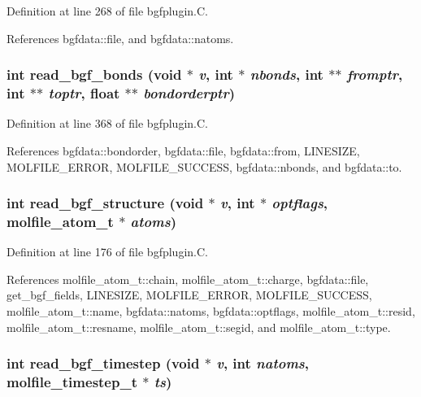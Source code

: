 Definition at line 268 of file bgfplugin.C.

References bgfdata::file, and bgfdata::natoms.
\subsubsection{\setlength{\rightskip}{0pt plus 5cm}int read\_\-bgf\_\-bonds (void $\ast$ {\em v}, int $\ast$ {\em nbonds}, int $\ast$$\ast$ {\em fromptr}, int $\ast$$\ast$ {\em toptr}, float $\ast$$\ast$ {\em bondorderptr})\hspace{0.3cm}{\tt  [static]}}\label{bgfplugin_8C_a12}




Definition at line 368 of file bgfplugin.C.

References bgfdata::bondorder, bgfdata::file, bgfdata::from, LINESIZE, MOLFILE\_\-ERROR, MOLFILE\_\-SUCCESS, bgfdata::nbonds, and bgfdata::to.
\subsubsection{\setlength{\rightskip}{0pt plus 5cm}int read\_\-bgf\_\-structure (void $\ast$ {\em v}, int $\ast$ {\em optflags}, {\bf molfile\_\-atom\_\-t} $\ast$ {\em atoms})\hspace{0.3cm}{\tt  [static]}}\label{bgfplugin_8C_a6}




Definition at line 176 of file bgfplugin.C.

References molfile\_\-atom\_\-t::chain, molfile\_\-atom\_\-t::charge, bgfdata::file, get\_\-bgf\_\-fields, LINESIZE, MOLFILE\_\-ERROR, MOLFILE\_\-SUCCESS, molfile\_\-atom\_\-t::name, bgfdata::natoms, bgfdata::optflags, molfile\_\-atom\_\-t::resid, molfile\_\-atom\_\-t::resname, molfile\_\-atom\_\-t::segid, and molfile\_\-atom\_\-t::type.
\subsubsection{\setlength{\rightskip}{0pt plus 5cm}int read\_\-bgf\_\-timestep (void $\ast$ {\em v}, int {\em natoms}, {\bf molfile\_\-timestep\_\-t} $\ast$ {\em ts})\hspace{0.3cm}{\tt  [static]}}\label{bgfplugin_8C_a7}




